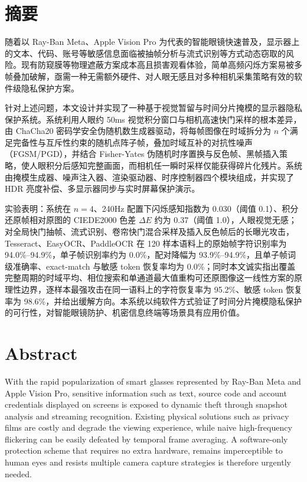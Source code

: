 \chapter*{摘\quad 要}

随着以 Ray-Ban Meta、Apple Vision Pro 为代表的智能眼镜快速普及，显示器上的文本、代码、账号等敏感信息面临被抽帧分析与流式识别等方式动态窃取的风险。现有防窥膜等物理遮蔽方案成本高且损害观看体验，简单高频闪烁方案易被多帧叠加破解，亟需一种无需额外硬件、对人眼无感且对多种相机采集策略有效的软件级隐私保护方案。

针对上述问题，本文设计并实现了一种基于视觉暂留与时间分片掩模的显示器隐私保护系统。系统利用人眼约 50ms 视觉积分窗口与相机高速快门采样的根本差异，由 ChaCha20 密码学安全伪随机数生成器驱动，将每帧图像在时域拆分为 $n$ 个满足完备性与互斥性约束的随机点阵子帧，叠加时域互补的对抗性噪声（FGSM/PGD），并结合 Fisher-Yates 伪随机时序置换与反色帧、黑帧插入策略，使人眼积分后感知完整画面，而相机任一瞬时采样仅能获得碎片化残片。系统由掩模生成器、噪声注入器、渲染驱动器、时序控制器四个模块组成，并实现了 HDR 亮度补偿、多显示器同步与实时屏幕保护演示。

实验表明：系统在 $n=4$、240Hz 配置下闪烁感知指数为 0.030（阈值 0.1）、积分还原帧相对原图的 CIEDE2000 色差 $\Delta E$ 约为 0.37（阈值 1.0），人眼视觉无感；对全局快门抽帧、流式识别、卷帘快门混合采样及插入反色帧后的长曝光攻击，Tesseract、EasyOCR、PaddleOCR 在 120 样本语料上的原始帧字符识别率为 94.0\%--94.9\%，单子帧识别率约为 0.0\%，配对降幅为 93.9\%--94.9\%，且单子帧词级准确率、exact-match 与敏感 token 恢复率均为 0.0\%；同时本文诚实指出覆盖完整周期的时域平均、相位搜索和单通道最大值重构可还原图像这一线性方案的原理性边界，逐样本最强攻击在同一语料上的字符恢复率为 95.2\%、敏感 token 恢复率为 98.6\%，并给出缓解方向。本系统以纯软件方式验证了时间分片掩模隐私保护的可行性，对智能眼镜防护、机密信息终端等场景具有应用价值。

\vspace{6mm}

\chapter*{Abstract}

With the rapid popularization of smart glasses represented by Ray-Ban Meta and Apple Vision Pro, sensitive information such as text, source code and account credentials displayed on screens is exposed to dynamic theft through snapshot analysis and streaming recognition. Existing physical solutions such as privacy films are costly and degrade the viewing experience, while naive high-frequency flickering can be easily defeated by temporal frame averaging. A software-only protection scheme that requires no extra hardware, remains imperceptible to human eyes and resists multiple camera capture strategies is therefore urgently needed.

